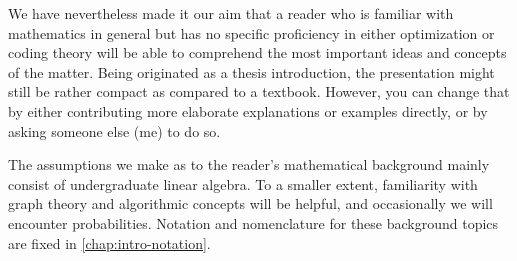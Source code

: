 \documentclass[
  paper=a4,
  parskip=half,
  english,
  fontsize=11pt,
  BCOR=1mm,
  DIV=10,
  twoside=true,
  toc=bib,
  numbers=noendperiod
]{scrbook}
\theoremstyle{change}
\theoremstyle{nonumberplain}
\begin{document}
We have nevertheless made it our aim that a reader who is familiar with mathematics in general but has no specific proficiency in either optimization or coding theory will be able to comprehend the most important ideas and concepts of the matter. Being originated as a thesis introduction, the presentation might still be rather compact as compared to a textbook. However, you can change that by either contributing more elaborate explanations or examples directly, or by asking someone else (\eg me) to do so.

The assumptions we make as to the reader's mathematical background mainly consist of undergraduate linear algebra. To a smaller extent, familiarity with graph theory and algorithmic concepts will be helpful, and occasionally we will encounter probabilities. Notation and nomenclature for these background topics are fixed in \cref{chap:intro-notation}.





\printbibliography[heading=bibintoc]
\end{document}
